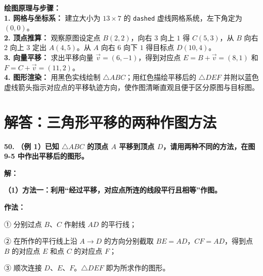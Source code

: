 \documentclass[12pt, a4paper]{ctexrep}
\begin{document}
\vspace{0.4cm}
{\small\color{blue!70!black}
\textbf{绘图原理与步骤：}\\
\textbf{1. 网格与坐标系：} 建立大小为 $13 \times 7$ 的 \texttt{dashed} 虚线网格系统，左下角定为 $(0,0)$。\\
\textbf{2. 顶点推算：} 观察原图设定点 $B(2,2)$，向右 $3$ 向上 $1$ 得 $C(5,3)$，从 $B$ 向右 $2$ 向上 $3$ 定出 $A(4,5)$。从 $A$ 向右 $6$ 向下 $1$ 得目标点 $D(10,4)$。\\
\textbf{3. 向量平移：} 求出平移向量 $\vec{v} = (6, -1)$，得到对应点 $E = B + \vec{v} = (8,1)$ 和 $F = C + \vec{v} = (11,2)$。\\
\textbf{4. 图形渲染：} 用黑色实线绘制 $\triangle ABC$；用红色描绘平移后的 $\triangle DEF$ 并附以蓝色虚线箭头指示对应点的平移轨迹方向，使作图清晰直观且便于区分原图与目标图。
}

\newpage

\section{解答：三角形平移的两种作图方法}

\vspace{0.6cm}

\textbf{\LARGE 50.} \textbf{（例 1）已知 $\triangle ABC$ 的顶点 $A$ 平移到顶点 $D$，请用两种不同的方法，在图 9-5 中作出平移后的图形。}

\vspace{0.4cm}
\textbf{解：}

\textbf{（1）方法一：利用“经过平移，对应点所连的线段平行且相等”作图。}

\textbf{作法：}

① 分别过点 $B$、$C$ 作射线 $AD$ 的平行线；

② 在所作的平行线上沿 $A \to D$ 的方向分别截取 $BE = AD$，$CF = AD$，得到点 $B$ 的对应点 $E$ 和点 $C$ 的对应点 $F$；

③ 顺次连接 $D$、$E$、$F$。$\triangle DEF$ 即为所求作的图形。
\end{document}
